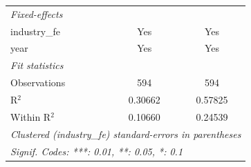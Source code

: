 \begin{tabular}{lcc}
   \midrule
   \emph{Fixed-effects}\\
   industry\_fe                                    & Yes                       & Yes\\  
   year                                            & Yes                       & Yes\\  
   \midrule
   \emph{Fit statistics}\\
   Observations                                    & 594                       & 594\\  
   R$^2$                                           & 0.30662                   & 0.57825\\  
   Within R$^2$                                    & 0.10660                   & 0.24539\\  
   \midrule \midrule
   \multicolumn{3}{l}{\emph{Clustered (industry\_fe) standard-errors in parentheses}}\\
   \multicolumn{3}{l}{\emph{Signif. Codes: ***: 0.01, **: 0.05, *: 0.1}}\\
\end{tabular}
\par\endgroup

